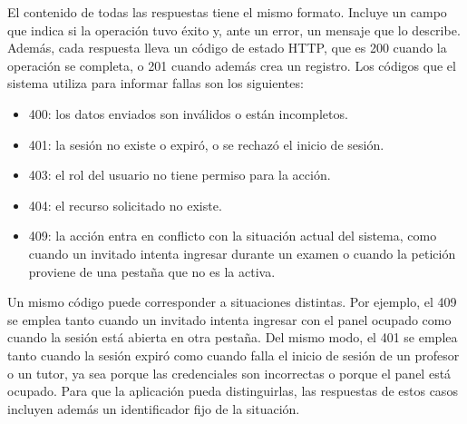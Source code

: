 
El contenido de todas las respuestas tiene el mismo formato. Incluye un campo que indica si la operación tuvo éxito y, ante un error, un mensaje que lo describe. Además, cada respuesta lleva un código de estado HTTP, que es 200 cuando la operación se completa, o 201 cuando además crea un registro. Los códigos que el sistema utiliza para informar fallas son los siguientes:


\begin{itemize}

\item 400: los datos enviados son inválidos o están incompletos.

\item 401: la sesión no existe o expiró, o se rechazó el inicio de sesión.

\item 403: el rol del usuario no tiene permiso para la acción.

\item 404: el recurso solicitado no existe.


\item 409: la acción entra en conflicto con la situación actual del sistema, como cuando un invitado intenta ingresar durante un examen o cuando la petición proviene de una pestaña que no es la activa.

\end{itemize}

Un mismo código puede corresponder a situaciones distintas. Por ejemplo, el 409 se emplea tanto cuando un invitado intenta ingresar con el panel ocupado como cuando la sesión está abierta en otra pestaña. Del mismo modo, el 401 se emplea tanto cuando la sesión expiró como cuando falla el inicio de sesión de un profesor o un tutor, ya sea porque las credenciales son incorrectas o porque el panel está ocupado. Para que la aplicación pueda distinguirlas, las respuestas de estos casos incluyen además un identificador fijo de la situación.

